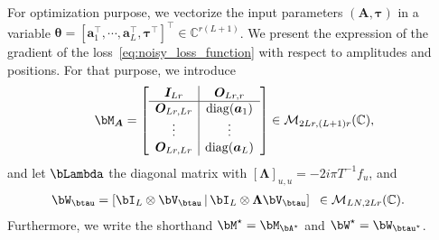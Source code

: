 \documentclass[conference,english]{IEEEtran}
\begin{document}
For optimization purpose, we vectorize the input parameters $(\bm{A}, \bm{\tau})$ in a variable $\bm{\theta} = {[ \bm{a}_1^\top, 
\cdots, \bm{a}_L^\top, \bm{\tau}^\top]}^\top \in \mathbb{C}^{r(L+1)}$. 
We present the expression of the gradient of the loss~\eqref{eq:noisy_loss_function} with respect to amplitudes and positions. For that purpose, we introduce
\[
\bM_{\bm{A}} = \left[\begin{array}{c|c}
    \bm{I}_{Lr} & \bm{O}_{Lr,r} \\\hline
    \bm{O}_{Lr,Lr} & \diag(\bm{a}_{1}) \\
    \vdots &  \vdots\\
    \bm{O}_{Lr,Lr} & \diag(\bm{a}_{L})
    \end{array}\right]
 \in \mathcal{M}_{2Lr,(L+1)r}(\mathbb{C}),
\]
and let $\bLambda$ the diagonal matrix with $[\bm{\Lambda}]_{u,u} = -2 i \pi T^{-1} f_u$, and
\begin{align*}
\bW_\btau &= \left[\bI_L \otimes \bV_\btau \,|\, \bI_L \otimes \bm{\Lambda} \bV_\btau \right] \,\ \in \mathcal{M}_{LN,2Lr}(\mathbb{C}).
\end{align*} 
Furthermore, we write the shorthand $\bM^\star = \bM_{\bA^\star}$ and $\bW^\star = \bW_{\btau^\star}$. 
\end{document}
